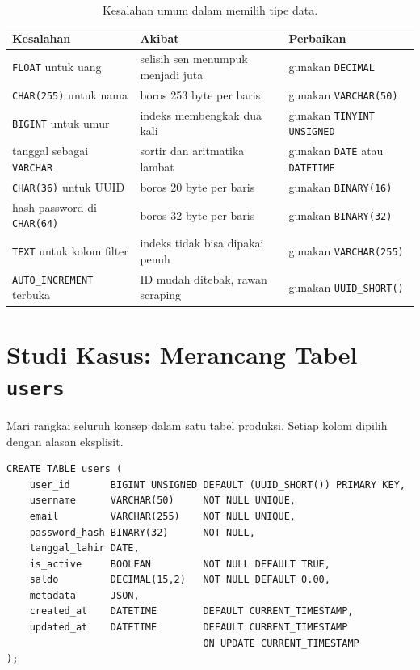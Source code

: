 \documentclass[11pt,a4paper]{article}
\begin{document}
\begin{table}[H]
	\centering
	\caption{Kesalahan umum dalam memilih tipe data.}
	\label{tab:mistakes}
	\footnotesize
	\begin{tabularx}{\textwidth}{l X X}
		\toprule
		Kesalahan                          & Akibat                            & Perbaikan                                    \\
		\midrule
		\texttt{FLOAT} untuk uang          & selisih sen menumpuk menjadi juta & gunakan \texttt{DECIMAL}                     \\
		\texttt{CHAR(255)} untuk nama      & boros 253 byte per baris          & gunakan \texttt{VARCHAR(50)}                 \\
		\texttt{BIGINT} untuk umur         & indeks membengkak dua kali        & gunakan \texttt{TINYINT UNSIGNED}            \\
		tanggal sebagai \texttt{VARCHAR}   & sortir dan aritmatika lambat      & gunakan \texttt{DATE} atau \texttt{DATETIME} \\
		\texttt{CHAR(36)} untuk UUID       & boros 20 byte per baris           & gunakan \texttt{BINARY(16)}                  \\
		hash password di \texttt{CHAR(64)} & boros 32 byte per baris           & gunakan \texttt{BINARY(32)}                  \\
		\texttt{TEXT} untuk kolom filter   & indeks tidak bisa dipakai penuh   & gunakan \texttt{VARCHAR(255)}                \\
		\texttt{AUTO\_INCREMENT} terbuka   & ID mudah ditebak, rawan scraping  & gunakan \texttt{UUID\_SHORT()}               \\
		\bottomrule
	\end{tabularx}
\end{table}

\section{Studi Kasus: Merancang Tabel \texttt{users}}

Mari rangkai seluruh konsep dalam satu tabel produksi. Setiap kolom dipilih dengan alasan eksplisit.

\begin{lstlisting}[style=code]
CREATE TABLE users (
    user_id       BIGINT UNSIGNED DEFAULT (UUID_SHORT()) PRIMARY KEY,
    username      VARCHAR(50)     NOT NULL UNIQUE,
    email         VARCHAR(255)    NOT NULL UNIQUE,
    password_hash BINARY(32)      NOT NULL,
    tanggal_lahir DATE,
    is_active     BOOLEAN         NOT NULL DEFAULT TRUE,
    saldo         DECIMAL(15,2)   NOT NULL DEFAULT 0.00,
    metadata      JSON,
    created_at    DATETIME        DEFAULT CURRENT_TIMESTAMP,
    updated_at    DATETIME        DEFAULT CURRENT_TIMESTAMP
                                  ON UPDATE CURRENT_TIMESTAMP
);
\end{lstlisting}
\end{document}
